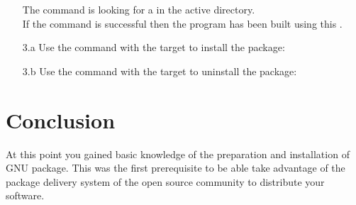 \begin{enumerate}
\begin{itemize}
{{}}
\end{itemize}
\vspace{-0.5cm}
The  command is looking for a  in the active directory. \\
If the  command is successful then the program has been built using this .
\item[3.a] Use the  command with the  target to install the package: 
{\footnotesize{
\begin{scripti}
 
\end{scripti}
}}
\item[3.b] Use the  command with the  target to uninstall the package: 
{\footnotesize{
\begin{scripti}
 
\end{scripti}
}}

\end{enumerate}

\section{Conclusion}

At this point you gained basic knowledge of the preparation and installation of GNU package. 
This was the first prerequisite to be able take advantage of the package delivery system of the open source community
to distribute your software. 
